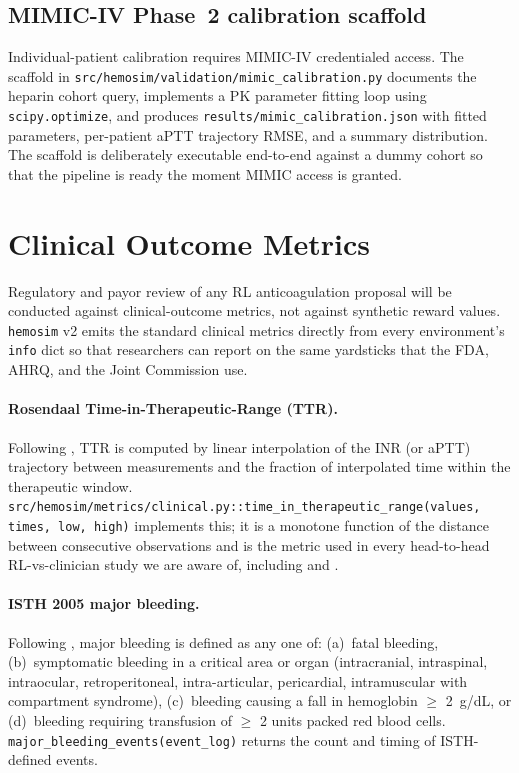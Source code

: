 \documentclass[11pt]{article}
\begin{document}
\subsection{MIMIC-IV Phase~2 calibration scaffold}

Individual-patient calibration requires MIMIC-IV \citep{johnson2023mimic4} credentialed access. The scaffold in \texttt{src/hemosim/validation/mimic\_calibration.py} documents the heparin cohort query, implements a PK parameter fitting loop using \texttt{scipy.optimize}, and produces \texttt{results/mimic\_calibration.json} with fitted parameters, per-patient aPTT trajectory RMSE, and a summary distribution. The scaffold is deliberately executable end-to-end against a dummy cohort so that the pipeline is ready the moment MIMIC access is granted.

\section{Clinical Outcome Metrics}
\label{sec:metrics}

Regulatory and payor review of any RL anticoagulation proposal will be conducted against clinical-outcome metrics, not against synthetic reward values. \texttt{hemosim} v2 emits the standard clinical metrics directly from every environment's \texttt{info} dict so that researchers can report on the same yardsticks that the FDA, AHRQ, and the Joint Commission use.

\paragraph{Rosendaal Time-in-Therapeutic-Range (TTR).}
Following \citet{rosendaal1993}, TTR is computed by linear interpolation of the INR (or aPTT) trajectory between measurements and the fraction of interpolated time within the therapeutic window. \texttt{src/hemosim/metrics/clinical.py::time\_in\_therapeutic\_range(values, times, low, high)} implements this; it is a monotone function of the distance between consecutive observations and is the metric used in every head-to-head RL-vs-clinician study we are aware of, including \citet{nemati2016} and \citet{komorowski2018}.

\paragraph{ISTH 2005 major bleeding.}
Following \citet{schulman2005iostroke}, major bleeding is defined as any one of: (a)~fatal bleeding, (b)~symptomatic bleeding in a critical area or organ (intracranial, intraspinal, intraocular, retroperitoneal, intra-articular, pericardial, intramuscular with compartment syndrome), (c)~bleeding causing a fall in hemoglobin $\geq$ 2~g/dL, or (d)~bleeding requiring transfusion of $\geq$ 2 units packed red blood cells. \texttt{major\_bleeding\_events(event\_log)} returns the count and timing of ISTH-defined events.
\end{document}
